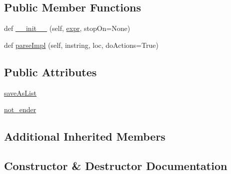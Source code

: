 \subsection*{Public Member Functions}
\begin{DoxyCompactItemize}
\item 
def \hyperlink{classpkg__resources_1_1__vendor_1_1pyparsing_1_1__MultipleMatch_a4c78811bf28646eef2cd62ff22dc3410}{\+\_\+\+\_\+init\+\_\+\+\_\+} (self, \hyperlink{classpkg__resources_1_1__vendor_1_1pyparsing_1_1ParseElementEnhance_a34e02b3404b2a545ca1be8b522758896}{expr}, stop\+On=None)
\item 
def \hyperlink{classpkg__resources_1_1__vendor_1_1pyparsing_1_1__MultipleMatch_afa55e1218db30131a0fb909235422e36}{parse\+Impl} (self, instring, loc, do\+Actions=True)
\end{DoxyCompactItemize}
\subsection*{Public Attributes}
\begin{DoxyCompactItemize}
\item 
\hyperlink{classpkg__resources_1_1__vendor_1_1pyparsing_1_1__MultipleMatch_ae775fc868bff417f72a535445862ebdf}{save\+As\+List}
\item 
\hyperlink{classpkg__resources_1_1__vendor_1_1pyparsing_1_1__MultipleMatch_a7f37e51e12ce6778be64ce30181617a0}{not\+\_\+ender}
\end{DoxyCompactItemize}
\subsection*{Additional Inherited Members}


\subsection{Constructor \& Destructor Documentation}
\mbox{\label{classpkg__resources_1_1__vendor_1_1pyparsing_1_1__MultipleMatch_a4c78811bf28646eef2cd62ff22dc3410}} 
